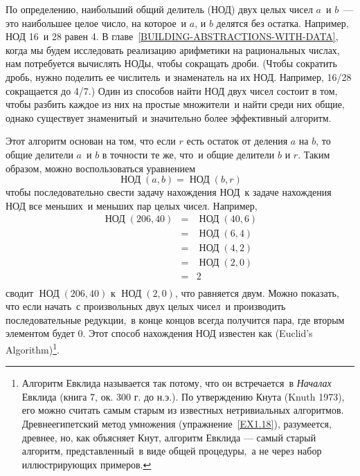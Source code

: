 По определению, 
 наибольший общий делитель (НОД) двух целых
чисел $a$~и $b$~--- это наибольшее целое число,
на которое~и $a$, и $b$ делятся без
остатка. Например, НОД 16~и 28 равен 4. В главе~\ref{BUILDING-ABSTRACTIONS-WITH-DATA}, когда мы будем 
исследовать реализацию арифметики на рациональных числах, нам
потребуется вы\-чи\-слять НОДы, чтобы сокращать дроби. (Чтобы сократить
дробь, нужно поделить ее числитель~и знаменатель на их НОД.  Например,
16/28 со\-кра\-ща\-ет\-ся до 4/7.) Один из способов найти НОД двух чисел состоит
в том, чтобы разбить каждое из них на простые множители~и найти среди
них общие, однако существует знаменитый~и значительно более
эффективный алгоритм.


Этот алгоритм основан на том, что если
$r$ есть остаток от деления $a$ на
$b$, то общие делители $a$~и $b$ в
точности те же, что~и общие делители $b$ и
$r$. Таким образом, можно воспользоваться уравнением
$$
        \mathop{\mbox{НОД}} (a,b) = \mathop{\mbox{НОД}} (b, r)
$$
чтобы последовательно свести задачу нахождения НОД~к задаче нахождения 
НОД все меньших~и меньших пар целых чисел. Например,
$$
\begin{array}{rcl}
 \mathop{\mbox{НОД}} (206,40) & = & \mathop{\mbox{НОД}} (40, 6) \\
                           & = & \mathop{\mbox{НОД}} (6, 4) \\
                           & = & \mathop{\mbox{НОД}} (4, 2) \\
                           & = & \mathop{\mbox{НОД}} (2, 0) \\
                           & = & 2 \\
\end{array}
$$
сводит $\mathop{\mbox{НОД}} (206, 40)$ к
$\mathop{\mbox{НОД}} (2,0)$, что равняется двум.  Можно показать, что если
начать~с произвольных двух целых чисел~и производить последовательные
редукции,~в конце концов всегда получится пара, где вторым элементом
будет 0. Этот способ нахождения НОД известен как
 (Euclid's Algorithm)\footnote{Алгоритм Евклида называется так потому, что он
  встречается~в {\em{}
    Началах}  Евклида (книга 7, ок. 300 г. до н.э.). По утверждению 
  Кнута (Knuth 1973),
  его можно
  считать самым старым из известных нетривиальных алгоритмов.
  Древнеегипетский метод умножения (упражнение~\ref{EX1.18}),
  разумеется, древнее, но, как объясняет Кнут, алгоритм Евклида ---
  самый старый алгоритм, представленный~в виде общей процедуры,~а не
  через набор иллюстрирующих примеров.}.

